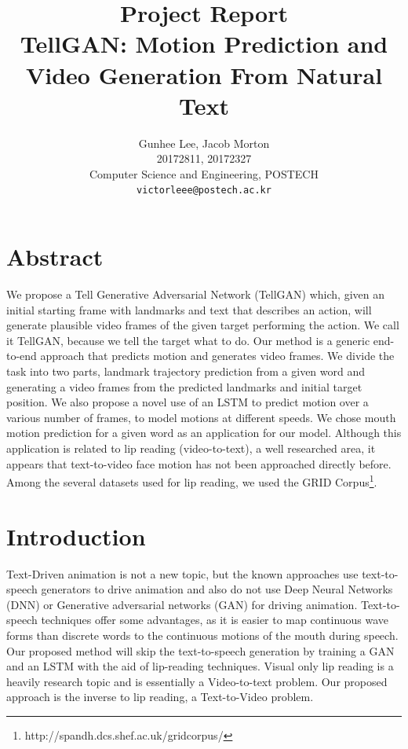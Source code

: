\documentclass[10pt,twocolumn,letterpaper]{article}
\begin{document}
\title{Project Report\\
TellGAN: Motion Prediction and Video Generation From Natural Text}

\author{Gunhee Lee, Jacob Morton\\
20172811, 20172327\\
Computer Science and Engineering, POSTECH\\
{\tt\small victorleee@postech.ac.kr}
}


\maketitle


\section{Abstract}

 We propose a Tell Generative Adversarial Network (TellGAN) which, given an initial starting frame with landmarks and text that describes an action, will generate plausible video frames of the given target performing the action. We call it TellGAN, because we tell the target what to do. Our method is a generic end-to-end approach that predicts motion and generates video frames. We divide the task into two parts, landmark trajectory prediction from a given word and generating a video frames from the predicted landmarks and initial target position. We also propose a novel use of an LSTM to predict motion over a various number of frames, to model motions at different speeds. We chose mouth motion prediction for a given word as an application for our model. Although this application is related to lip reading (video-to-text), a well researched area, it appears that text-to-video face motion has not been approached directly before.  Among the several datasets used for lip reading, we used the GRID Corpus\footnote{http://spandh.dcs.shef.ac.uk/gridcorpus/}.
 
\section{Introduction}
 Text-Driven animation is not a new topic, but the known approaches use text-to-speech generators to drive animation and also do not use Deep Neural Networks (DNN) or Generative adversarial networks (GAN) for driving animation. Text-to-speech techniques offer some advantages, as it is easier to map continuous wave forms than discrete words to the continuous motions of the mouth during speech. Our proposed method will skip the text-to-speech generation by training a GAN and an LSTM with the aid of lip-reading techniques. Visual only lip reading is a heavily research topic and is essentially a Video-to-text problem. Our proposed approach is the inverse to lip reading, a Text-to-Video problem.
\end{document}
